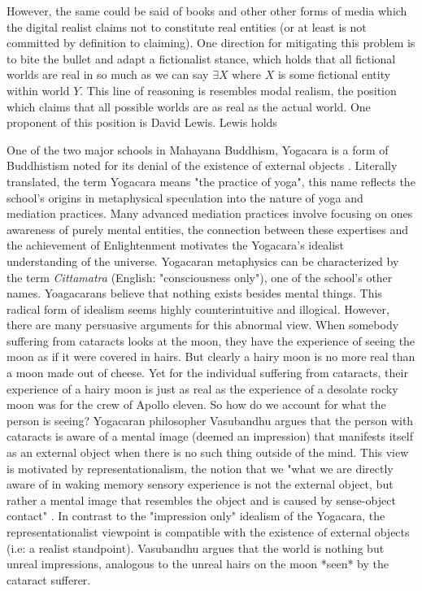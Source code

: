 However, the same could be said of books and other other forms of media which the digital realist claims not to constitute real entities (or at least is not committed by definition to claiming). One direction for mitigating this problem is to bite the bullet and adapt a fictionalist stance, which holds that all fictional worlds are real in so much as we can say $\exists X$ where $X$ is some fictional entity within world $Y$. This line of reasoning is resembles modal realism, the position which claims that all possible worlds are as real as the actual world.\cite{lewis1986on} One proponent of this position is David Lewis. Lewis holds

One of the two major schools in Mahayana Buddhism, Yogacara is a form of Buddhistism noted for its denial of the existence of external objects \cite{siderits2007buddhism} . Literally translated, the term Yogacara means "the practice of yoga", this name reflects the school's origins in metaphysical speculation into the nature of yoga and mediation practices. Many advanced mediation practices involve focusing on ones awareness of purely mental entities, the connection between these expertises and the achievement of Enlightenment motivates the Yogacara's idealist understanding of the universe. Yogacaran metaphysics can be characterized by the term \textit{Cittamatra} (English: "consciousness only"), one of the school's other names. Yoagacarans believe that nothing exists besides mental things. This radical form of idealism seems highly counterintuitive and illogical. However, there are many persuasive arguments for this abnormal view. When somebody suffering from cataracts looks at the moon, they have the experience of seeing the moon as if it were covered in hairs. But clearly a hairy moon is no more real than a moon made out of cheese. Yet for the individual suffering from cataracts, their experience of a hairy moon is just as real as the experience of a desolate rocky moon was for the crew of Apollo eleven. So how do we account for what the person is seeing? Yogacaran philosopher Vasubandhu argues that the person with cataracts is aware of a mental image (deemed an impression) that manifests itself as an external object when there is no such thing outside of the mind. This view is motivated by representationalism, the notion that we "what we are directly aware of in waking memory sensory experience is not the external object, but rather a mental image that resembles the object and is caused by sense-object contact" \cite{siderits2007buddhism}.  \newline In contrast to the "impression only" idealism of the Yogacara, the representationalist viewpoint is compatible with the existence of external objects (i.e: a realist standpoint). Vasubandhu argues that the world is nothing but unreal impressions, analogous to the unreal hairs on the moon *seen* by the cataract sufferer.
